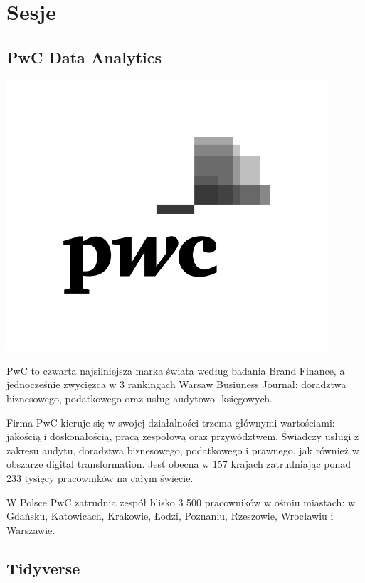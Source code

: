 \documentclass[11pt,twoside,b5paper]{book}
\begin{document}
\chapter{Sesje}{\LARGE}
\newpage
\section{PwC Data Analytics}
\begin{minipage}[t]{0.915\textwidth}
	\center     
    \includegraphics[width=450px]{img/PwC_logo_new.png} 
\end{minipage}

PwC to czwarta najsilniejsza marka świata według badania Brand Finance, a jednocześnie zwycięzca w 3 rankingach Warsaw Busiuness Journal: doradztwa biznesowego, podatkowego oraz usług audytowo- księgowych.

Firma PwC kieruje się w swojej działalności trzema głównymi wartościami: jakością i doskonałością, pracą zespołową oraz przywództwem. Świadczy usługi z zakresu audytu, doradztwa biznesowego, podatkowego i prawnego, jak również w obszarze digital transformation. Jest obecna w 157 krajach zatrudniając ponad 233 tysięcy pracowników na całym świecie.

W Polsce PwC zatrudnia zespół blisko 3 500 pracowników w ośmiu miastach: w Gdańsku, Katowicach, Krakowie, Łodzi, Poznaniu, Rzeszowie, Wrocławiu i Warszawie.
\newpage



\newpage
\section{Tidyverse}{}

\newpage



\end{document}
